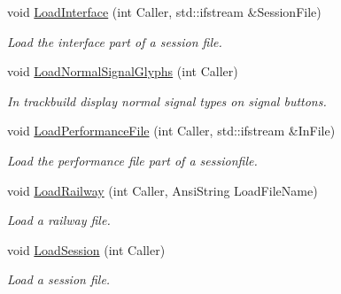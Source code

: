 \begin{DoxyCompactItemize}
\mbox{\label{class_t_interface_ad2e9b9996aa6ebd7108d14d8db399da8}} 
void \mbox{\hyperlink{class_t_interface_ad2e9b9996aa6ebd7108d14d8db399da8}{Load\+Interface}} (int Caller, std\+::ifstream \&Session\+File)
\begin{DoxyCompactList}\small\item\em Load the interface part of a session file. \end{DoxyCompactList}\item 
\mbox{\label{class_t_interface_a170d7ac96ec862ba0c2587972f266407}} 
void \mbox{\hyperlink{class_t_interface_a170d7ac96ec862ba0c2587972f266407}{Load\+Normal\+Signal\+Glyphs}} (int Caller)
\begin{DoxyCompactList}\small\item\em In trackbuild display normal signal types on signal buttons. \end{DoxyCompactList}\item 
\mbox{\label{class_t_interface_a62921b8aed8b5e8b36bd048db159a038}} 
void \mbox{\hyperlink{class_t_interface_a62921b8aed8b5e8b36bd048db159a038}{Load\+Performance\+File}} (int Caller, std\+::ifstream \&In\+File)
\begin{DoxyCompactList}\small\item\em Load the performance file part of a sessionfile. \end{DoxyCompactList}\item 
\mbox{\label{class_t_interface_a95c3545a30171ca5a08e34c58160079c}} 
void \mbox{\hyperlink{class_t_interface_a95c3545a30171ca5a08e34c58160079c}{Load\+Railway}} (int Caller, Ansi\+String Load\+File\+Name)
\begin{DoxyCompactList}\small\item\em Load a railway file. \end{DoxyCompactList}\item 
\mbox{\label{class_t_interface_a636b1b4bd29f2678a3290ed2d282f1c2}} 
void \mbox{\hyperlink{class_t_interface_a636b1b4bd29f2678a3290ed2d282f1c2}{Load\+Session}} (int Caller)
\begin{DoxyCompactList}\small\item\em Load a session file. \end{DoxyCompactList}\item 

\end{DoxyCompactItemize}
